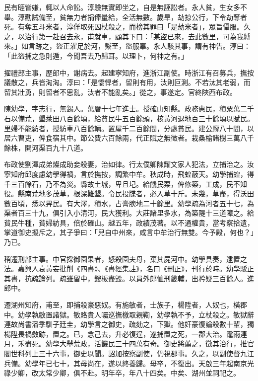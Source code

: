 \begin{pinyinscope}
民有睚眥嫌，輒以人命訟。淳驗無實即坐之，自是無誣訟者。永人貧，生女多不舉。淳勸誡備至，貧無力者捐俸量給，全活無數。歲旱，劫掠公行，下令劫奪者死。有奪五斗米者，淳佯取死囚杖殺之，而榜其罪曰「是劫米者」，眾旨懾服。久之，以治行第一赴召去永，甫就車，顧其下曰：「某盜已來，去此數里，可為我縛來。」如言跡之，盜正濯足於河，繫至，盜服辜。永人駭其事，謂有神告。淳曰：「此盜捕之急則遁，今聞吾去乃歸耳。以理卜，何神之有。」

擢禮部主事，歷郎中，謝病去。起建寧知府，進浙江副使。時浙江有召募兵，撫按議散之，兵皆洶洶。淳曰：「是憍悍者，留則有用，汰則叵測。不若汰其老弱，而留其壯勇，則留者不思亂，汰者不能亂矣。」從之，事遂定。官終陜西布政。

陳幼學，字志行，無錫人。萬曆十七年進士。授確山知縣。政務惠民，積粟萬二千石以備荒，墾萊田八百餘頃，給貧民牛五百餘頭，核黃河退地百三十餘頃以賦民。里婦不能紡者，授紡車八百餘輛。置屋千二百餘間，分處貧民。建公廨八十間，以居六曹吏，俾食宿其中。節公費六百餘兩，代正賦之無徵者。栽桑榆諸樹三萬八千餘株，開河渠百九十八道。

布政使劉渾成弟燦成助妾殺妻，治如律。行太僕卿陳耀文家人犯法，立捕治之。汝寧知府邱度慮幼學得禍，言於撫按，調繁中牟。秋成時，飛蝗蔽天。幼學捕蝗，得千三百餘石，乃不為災。縣故土城，卑且圮。給饑民粟，俾修築，工成，民不知役。縣南荒地多茂草，根深難墾。令民投牒者，必入草十斤。未幾，草盡，得沃田數百頃，悉以畀民。有大澤，積水，占膏腴地二十餘里。幼學疏為河者五十七，為渠者百三十九，俱引入小清河，民大獲利。大莊諸里多水，為築隄十三道障之。給貧民牛種，貧婦紡具，倍於確山。越五年，政績茂著。以不通權貴，當考察拾遺，掌道御史擬斥之，其子爭曰：「兒自中州來，咸言中牟治行無雙。今予殿，何也？」乃已。

稍遷刑部主事。中官採御園果者，怒殺園夫母，棄其屍河中。幼學具奏，逮置之法。嘉興人袁黃妄批削《四書》、《書經集註》，名曰《刪正》，刊行於時。幼學駁正其書，抗疏論列。疏雖留中，鏤板盡毀。以員外郎恤刑畿輔，出矜疑三百餘人。進郎中。

遷湖州知府，甫至，即捕殺豪惡奴。有施敏者，士族子，楊陞者，人奴也，橫郡中。幼學執敏置諸獄。敏賂貴人囑巡撫檄取親鞫，幼學執不予，立杖殺之。敏獄辭連故尚書潘季馴子廷圭，幼學言之御史，疏劾之，下獄。他奸豪復論殺數十輩，獨楊陞畏禍斂跡，置之。已，念己去，升必復逞，遂捕置之死，一郡大治。霪雨連月，禾盡死。幼學大舉荒政，活饑民三十四萬有奇。御史將薦之，徵其治行，推官閻世科列上三十六事，御史以聞。詔加按察副使，仍視郡事。久之，以副使督九江兵備。幼學年已七十，其母尚在，遂以終養歸。母卒，不復出。天啟三年起南京光祿少卿，改太常少卿，俱不赴。明年卒，年八十四矣。中矣、湖州並祠祀之。


\end{pinyinscope}